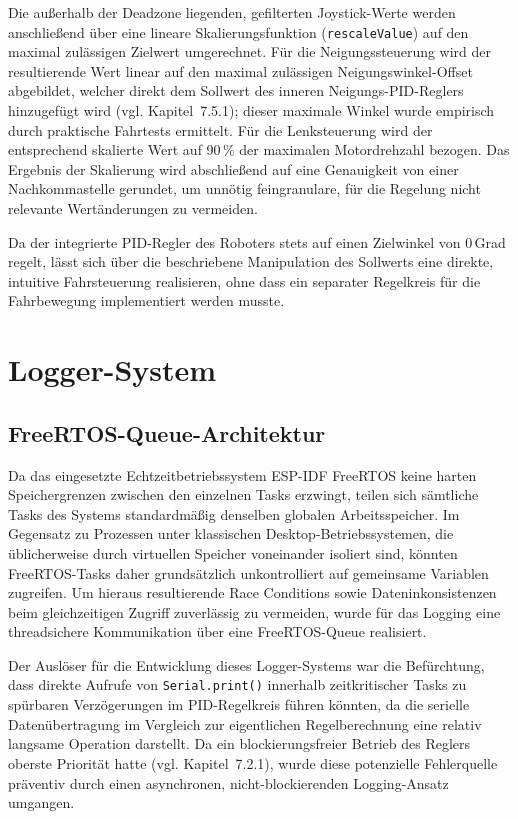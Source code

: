 \documentclass[12pt,ngerman,numbers=noenddot,abstracton,headsepline]{scrreprt}
\begin{document}
Die außerhalb der Deadzone liegenden, gefilterten Joystick-Werte werden anschließend über eine lineare Skalierungsfunktion (\texttt{rescaleValue}) auf den maximal zulässigen Zielwert umgerechnet. Für die Neigungssteuerung wird der resultierende Wert linear auf den maximal zulässigen Neigungswinkel-Offset abgebildet, welcher direkt dem Sollwert des inneren Neigungs-PID-Reglers hinzugefügt wird (vgl. Kapitel~7.5.1); dieser maximale Winkel wurde empirisch durch praktische Fahrtests ermittelt. Für die Lenksteuerung wird der entsprechend skalierte Wert auf 90\,\% der maximalen Motordrehzahl bezogen. Das Ergebnis der Skalierung wird abschließend auf eine Genauigkeit von einer Nachkommastelle gerundet, um unnötig feingranulare, für die Regelung nicht relevante Wertänderungen zu vermeiden.

Da der integrierte PID-Regler des Roboters stets auf einen Zielwinkel von 0\,Grad regelt, lässt sich über die beschriebene Manipulation des Sollwerts eine direkte, intuitive Fahrsteuerung realisieren, ohne dass ein separater Regelkreis für die Fahrbewegung implementiert werden musste.

\section{Logger-System}
\label{sec:logger_system}

\subsection{FreeRTOS-Queue-Architektur}
\label{subsec:logger_queue}

Da das eingesetzte Echtzeitbetriebssystem ESP-IDF FreeRTOS keine harten Speichergrenzen zwischen den einzelnen Tasks erzwingt, teilen sich sämtliche Tasks des Systems standardmäßig denselben globalen Arbeitsspeicher. Im Gegensatz zu Prozessen unter klassischen Desktop-Betriebssystemen, die üblicherweise durch virtuellen Speicher voneinander isoliert sind, könnten FreeRTOS-Tasks daher grundsätzlich unkontrolliert auf gemeinsame Variablen zugreifen. Um hieraus resultierende Race Conditions sowie Dateninkonsistenzen beim gleichzeitigen Zugriff zuverlässig zu vermeiden, wurde für das Logging eine threadsichere Kommunikation über eine FreeRTOS-Queue realisiert.

Der Auslöser für die Entwicklung dieses Logger-Systems war die Befürchtung, dass direkte Aufrufe von \texttt{Serial.print()} innerhalb zeitkritischer Tasks zu spürbaren Verzögerungen im PID-Regelkreis führen könnten, da die serielle Datenübertragung im Vergleich zur eigentlichen Regelberechnung eine relativ langsame Operation darstellt. Da ein blockierungsfreier Betrieb des Reglers oberste Priorität hatte (vgl. Kapitel~7.2.1), wurde diese potenzielle Fehlerquelle präventiv durch einen asynchronen, nicht-blockierenden Logging-Ansatz umgangen.
\end{document}
